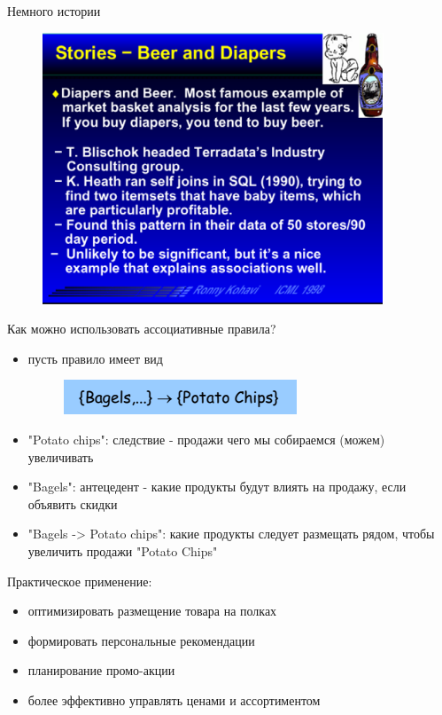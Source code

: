 \documentclass{beamer}
\begin{document}
\begin{frame}{Немного истории}
\begin{figure}[h]
\centering
\includegraphics[scale=0.9]{images/lec08-pic02.png}
\end{figure}
\end{frame}

\begin{frame}{Как можно использовать ассоциативные правила?}
\begin{itemize}
\item пусть правило имеет вид
  \begin{figure}[h]
  \centering
  \includegraphics[scale=0.9]{images/lec08-pic03.png}
  \end{figure}
\item "Potato chips": следствие - продажи чего мы собираемся (можем) увеличивать
\item "Bagels": антецедент - какие продукты будут влиять на продажу, если объявить скидки
\item "Bagels -> Potato chips": какие продукты следует размещать рядом, чтобы увеличить продажи "Potato Chips"
\end{itemize}
Практическое применение:
\begin{itemize}
\item оптимизировать размещение товара на полках
\item формировать персональные рекомендации
\item планирование промо-акции
\item более эффективно управлять ценами и ассортиментом
\end{itemize}
\end{frame}
\end{document}
